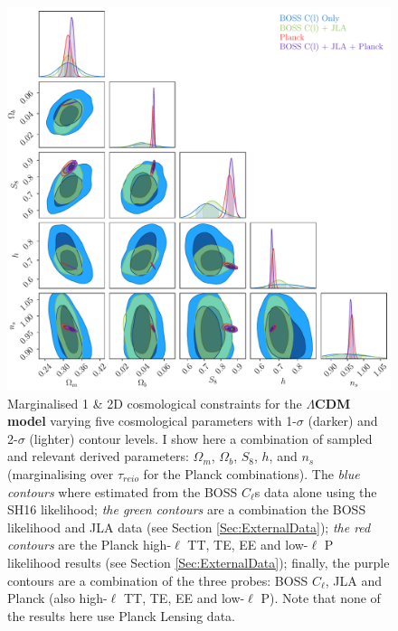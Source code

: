 \begin{figure}
\begin{center}
\includegraphics[width=\textwidth]{BOSS-FIGS/LCDM_Cosmology.pdf}
\caption[Marginalised 1 \& 2D cosmological constraints for the $\Lambda$CDM model.]{Marginalised 1 \& 2D cosmological constraints for the \textbf{$\Lambda$CDM model} varying five cosmological parameters with 1-$\sigma$ (darker) and 2-$\sigma$ (lighter) contour levels. I show here a combination of sampled and relevant derived parameters: $\Omega_m$, $\Omega_b$, $S_8$, $h$, and $n_s$ (marginalising over $\tau_{reio}$ for the Planck combinations). The \textit{blue contours} where estimated from the BOSS $C_{\ell}$s data alone using the SH16 likelihood; \textit{the green contours} are a combination the BOSS likelihood and JLA data (see Section \ref{Sec:ExternalData}); \textit{the red contours} are the Planck high-$\ell$ TT, TE, EE and low-$\ell$ P likelihood results (see Section \ref{Sec:ExternalData}); finally, the purple contours are a combination of the three probes: BOSS $C_{\ell}$, JLA and Planck (also high-$\ell$ TT, TE, EE and low-$\ell$ P). Note that none of the results here use Planck Lensing data.}
\label{fig:LCDM_Cosmology}
\end{center}
\end{figure}

